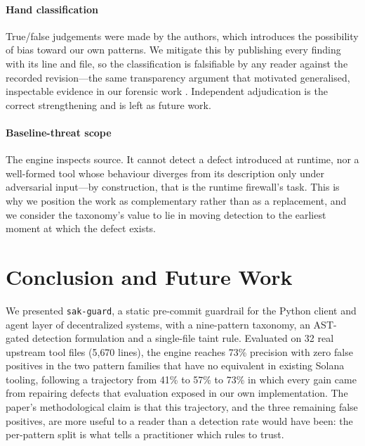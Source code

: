\paragraph{Hand classification}
True/false judgements were made by the authors, which introduces the
possibility of bias toward our own patterns. We mitigate this by publishing
every finding with its line and file, so the classification is falsifiable by
any reader against the recorded revision---the same transparency argument that
motivated generalised, inspectable evidence in our forensic work
\cite{firmansyah2024forensic}. Independent adjudication is the correct
strengthening and is left as future work.

\paragraph{Baseline-threat scope}
The engine inspects source. It cannot detect a defect introduced at runtime,
nor a well-formed tool whose behaviour diverges from its description only under
adversarial input---by construction, that is the runtime firewall's task. This
is why we position the work as complementary rather than as a replacement, and
we consider the taxonomy's value to lie in moving detection to the earliest
moment at which the defect exists.

\section{Conclusion and Future Work}

We presented \texttt{sak-guard}, a static pre-commit guardrail for the Python
client and agent layer of decentralized systems, with a nine-pattern taxonomy,
an AST-gated detection formulation and a single-file taint rule. Evaluated on
32 real upstream tool files (5{,}670 lines), the engine reaches 73\% precision
with zero false positives in the two pattern families that have no equivalent
in existing Solana tooling, following a trajectory from 41\% to 57\% to 73\% in
which every gain came from repairing defects that evaluation exposed in our own
implementation. The paper's methodological claim is that this trajectory, and
the three remaining false positives, are more useful to a reader than a
detection rate would have been: the per-pattern split is what tells a
practitioner which rules to trust.

